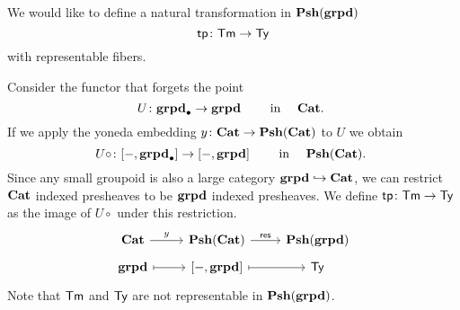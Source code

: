 \begin{defn}
  We would like to define a natural transformation in
  $\mathbf{Psh}(\mathbf{grpd})$
  \[ \mathsf{tp} \colon \mathsf{Tm} \to \mathsf{Ty} \]
  with representable fibers.

  Consider the functor that forgets the point
  \[
    U \colon \mathbf{grpd}_\bullet \to \mathbf{grpd}
    \quad \quad
    \text{
      in \quad $\mathbf{Cat}$.
    }
  \]
  If we apply the yoneda embedding $y \colon \mathbf{Cat} \to \mathbf{Psh}(\mathbf{Cat})$ to $U$
  we obtain
  \[ U \circ \colon [ - , \mathbf{grpd}_\bullet] \to [ - , \mathbf{grpd} ]
    \quad \quad
    \text{
      in \quad $\mathbf{Psh}(\mathbf{Cat})$.
    }
  \]
  Since any small groupoid is also a large category $\mathbf{grpd} \hookrightarrow \mathbf{Cat}$,
  we can restrict $\mathbf{Cat}$ indexed presheaves to be $\mathbf{grpd}$ indexed presheaves.
  We define $\mathsf{tp} \colon \mathsf{Tm} \to \mathsf{Ty}$ as the image of $U \circ$ under this restriction.
  \[\begin{tikzcd}[row sep = tiny]
    \Cat & \PshCat & \Pshgrpd \\
    \grpd & {[-,\grpd]} & \Type
    \arrow["y", from=1-1, to=1-2]
    \arrow["{\textsf{res}}", from=1-2, to=1-3]
    \arrow[maps to, from=2-1, to=2-2]
    \arrow[maps to, from=2-2, to=2-3]
  \end{tikzcd}\]
  Note that $\mathsf{Tm}$ and $\mathsf{Ty}$ are not representable in $\mathbf{Psh}(\mathbf{grpd})$.
\end{defn}
